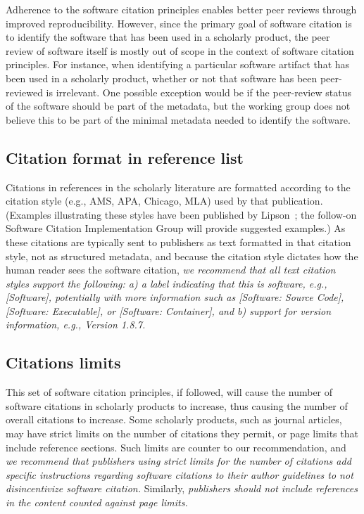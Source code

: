 \documentclass[12pt, oneside]{amsart}
\begin{document}
Adherence to the software citation principles enables better peer reviews through improved
reproducibility. However, since the primary goal of software citation is to identify the
software that has been used in a scholarly product, the peer review of software itself is
mostly out of scope in the context of software citation principles. For instance, when
identifying a particular software artifact that has been used in a scholarly product,
whether or not that software has been peer-reviewed is irrelevant. One possible exception
would be if the peer-review status of the software should
be part of the metadata, but the working group does not believe this to be part of the
minimal metadata needed to identify the software.


\subsection{Citation format in reference list}

Citations in references in the scholarly literature are formatted according to the citation 
style (e.g., AMS, APA, Chicago, MLA) used by that publication. (Examples illustrating these 
styles have been published by Lipson~\cite{lipson2011cite}; the follow-on Software Citation 
Implementation Group will provide suggested examples.)  As these citations are typically sent 
to publishers as text formatted in that citation style, not as structured metadata, and because 
the citation style dictates how the human reader sees the software citation, \textit{we recommend 
that all text citation styles support the following:
a) a label indicating that this is software, e.g., [Software], potentially with more information 
such as [Software: Source Code], [Software: Executable], or [Software: Container], 
and b) support for version information, e.g., Version 1.8.7.}

\subsection{Citations limits}

This set of software citation principles, if followed, will cause the number of software citations in scholarly products to increase, thus causing the number of overall citations to increase.
Some scholarly products, such as journal articles, may have strict limits on the number of citations they permit, or page limits that include reference sections.
Such limits are counter to our recommendation, and \textit{we recommend that publishers using strict limits for the number of citations add specific instructions regarding software citations to their author guidelines to not disincentivize software citation.}
Similarly,  \textit{publishers should not include references in the content counted against page limits.}
\end{document}
